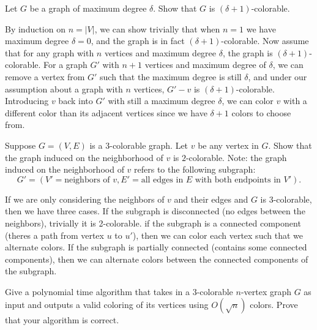 \documentclass[11pt]{article}
\begin{document}
\begin{subparts}
    \subpart \label{part:max-deg-color} Let $G$ be a graph of maximum degree $\delta$.  Show that $G$ is $(\delta+1)$-colorable.\\
    \begin{solution}
        By induction on $n=|V|$, we can show trivially that when $n=1$ we have maximum degree $\delta=0$, and the graph is 
        in fact $(\delta+1)$-colorable. Now assume that for any graph with $n$ vertices and maximum degree $\delta$, the graph is $(\delta + 1)$-colorable. For a graph $G'$ with
        $n+1$ vertices and maximum degree of $\delta$, we can remove a vertex from $G'$ such that the maximum degree is still $\delta$, and under our assumption about a graph with $n$ vertices, $G'-v$ is $(\delta + 1)$-colorable.
        Introducing $v$ back into $G'$ with still a maximum degree $\delta$, we can color $v$ with a different color than its adjacent vertices since we have $\delta + 1$ colors to choose from.       
    \end{solution}
    \subpart \label{part:bipartite-neighborhood} Suppose $G=(V, E)$ is a $3$-colorable graph.  Let $v$ be any vertex in $G$.  Show that the graph induced on the neighborhood of $v$ is $2$-colorable. 
    Note: the graph induced on the neighborhood of $v$ refers to the following subgraph: \[G' = (V'=\text{neighbors of $v$}, E'=\text{all edges in $E$ with both endpoints in $V'$}).\]
    \begin{solution}
        If we are only considering the neighbors of $v$ and their edges and $G$ is 3-colorable, then we have three cases. If the subgraph is disconnected (no edges between the neighbors), trivially it is 2-colorable. if the subgraph
        is a connected component (theres a path from vertex $u$ to $u'$), then we can color each vertex such that we alternate colors. If the subgraph is partially connected (contains some connected components), then we can alternate colors between the connected components of the 
        subgraph.
    \end{solution}
    \subpart \label{part:sqrtn-colors} Give a polynomial time algorithm that takes in a $3$-colorable $n$-vertex graph $G$ as input and outputs a valid coloring of its vertices using $O(\sqrt{n})$ colors.  Prove that your algorithm is correct.
    

\end{subparts}
\end{document}
